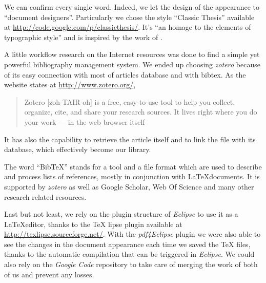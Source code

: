 We can confirm every single word. Indeed, we let the design of the
appearance to \enquote{document designers}. Particularly we chose
the style \enquote{Classic Thesis} available at
\url{http://code.google.com/p/classicthesis/}. It's \enquote{an
homage to the elements of typographic style} and is inspired by
the work of \citeauthor{bringhurst:2002} 
\cite{bringhurst:2002}.

A little workflow research on the Internet resources was done to
find a simple yet powerful bibliography management system. We
ended up choosing \emph{zotero} because of its easy connection
with most of articles database and with bibtex. As the website
states at \url{http://www.zotero.org/}, \blockquote{Zotero
[zoh-TAIR-oh] is a free, easy-to-use tool to help you collect,
organize, cite, and share your research sources. It lives right
where you do your work --- in the web browser itself}. It has also
the capability to retrieve the article itself and to link the file
with its database, which effectively become our library.

The word \enquote{BibTeX} stands for a tool and a file format
which are used to describe and process lists of references, mostly
in conjunction with \LaTeX documents. It is supported by
\emph{zotero} as well as Google Scholar, Web Of Science and many
other research related resources.

Last but not least, we rely on the plugin structure of
\emph{Eclipse} to use it as a \LaTeX editor, thanks to the \TeX
lipse plugin available at \url{http://texlipse.sourceforge.net/}.
With the \emph{pdf4Eclipse} plugin we were also able to see the
changes in the document appearance each time we saved the \TeX
files, thanks to the automatic compilation that can be triggered
in \emph{Eclipse}. We could also rely on the \emph{Google Code}
repository to take care of merging the work of both of us and
prevent any losses.
